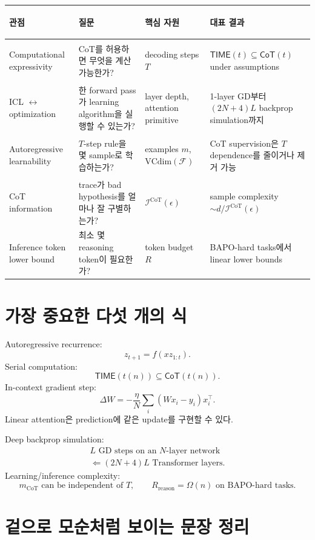 \documentclass[11pt,a4paper,oneside,openany]{memoir}
\newcommand{\F}{\mathcal{F}}
\newcommand{\CoT}{\mathsf{CoT}}
\newcommand{\TIME}{\mathsf{TIME}}
\newcommand{\VC}{\mathrm{VCdim}}
\newcommand{\Icot}{\mathcal{I}^{\mathrm{CoT}}}
\theoremstyle{definition}
\begin{document}
\begin{center}
\small
\begin{tabularx}{\textwidth}{>{\bfseries\raggedright\arraybackslash}p{}YYY}
\toprule
관점 & 질문 & 핵심 자원 & 대표 결과 \\
\midrule
Computational expressivity & CoT를 허용하면 무엇을 계산 가능한가? & decoding steps $T$ & $\TIME(t)\subseteq\CoT(t)$ under assumptions \\
ICL $\leftrightarrow$ optimization & 한 forward pass가 learning algorithm을 실행할 수 있는가? & layer depth, attention primitive & 1-layer GD부터 $(2N+4)L$ backprop simulation까지 \\
Autoregressive learnability & $T$-step rule을 몇 sample로 학습하는가? & examples $m$, $\VC(\F)$ & CoT supervision은 $T$ dependence를 줄이거나 제거 가능 \\
CoT information & trace가 bad hypothesis를 얼마나 잘 구별하는가? & $\Icot(\epsilon)$ & sample complexity $\sim d/\Icot(\epsilon)$ \\
Inference token lower bound & 최소 몇 reasoning token이 필요한가? & token budget $R$ & BAPO-hard tasks에서 linear lower bounds \\
\bottomrule
\end{tabularx}
\end{center}

\section{가장 중요한 다섯 개의 식}

Autoregressive recurrence:
\[
z_{t+1}=f(xz_{1:t}).
\]
Serial computation:
\[
\TIME(t(n))\subseteq\CoT(t(n)).
\]
In-context gradient step:
\[
\Delta W
=-\frac{\eta}{N}\sum_i(Wx_i-y_i)x_i^\top.
\]
Linear attention은 prediction에 같은 update를 구현할 수 있다.

Deep backprop simulation:
\[
\begin{gathered}
L\text{ GD steps on an }N\text{-layer network}\\
\Longleftarrow (2N+4)L\text{ Transformer layers}.
\end{gathered}
\]
Learning/inference complexity:
\[
m_{\mathrm{CoT}}\text{ can be independent of }T,
\qquad
R_{\mathrm{reason}}=\Omega(n)\text{ on BAPO-hard tasks.}
\]

\section{겉으로 모순처럼 보이는 문장 정리}
\end{document}
